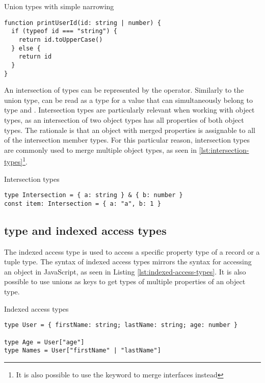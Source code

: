 \begin{listing}[ht]
  \caption{Union types with simple narrowing}\label{lst:union-types}
  \begin{verbatim}
function printUserId(id: string | number) {
  if (typeof id === "string") {
    return id.toUpperCase()
  } else {
    return id
  }
}
  \end{verbatim}
\end{listing}

An intersection of types can be represented by the \code{\&} operator. Similarly to the union type,  can be read as a type for a value that can simultaneously belong to type  and . Intersection types are particularly relevant when working with object types, as an intersection of two object types has all properties of both object types. The rationale is that an object with merged properties is assignable to all of the intersection member types. For this particular reason, intersection types are commonly used to merge multiple object types, as seen in \ref{lst:intersection-types}\footnote{It is also possible to use the  keyword to merge interfaces instead}.

\begin{listing}[ht]
  \caption{Intersection types}\label{lst:intersection-types}
  \begin{verbatim}
type Intersection = { a: string } & { b: number }
const item: Intersection = { a: "a", b: 1 }
  \end{verbatim}
\end{listing}

\subsection{ type and indexed access types}

The indexed access type is used to access a specific property type of a record or a tuple type. The syntax of indexed access types mirrors the syntax for accessing an object in JavaScript, as seen in Listing \ref{lst:indexed-access-types}. It is also possible to use unions as keys to get types of multiple properties of an object type.

\begin{listing}[ht]
  \caption{Indexed access types}\label{lst:indexed-access-types}
  \begin{verbatim}
type User = { firstName: string; lastName: string; age: number }

type Age = User["age"] 
type Names = User["firstName" | "lastName"]
\end{verbatim}
\end{listing}

